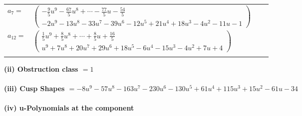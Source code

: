 \documentclass[1p]{elsarticle_modified}
\theoremstyle{definition}
\begin{document}
\begin{tabular}{m{7pt} m{180pt} m{7pt} m{180pt} }
\flushright $a_{7}=$&$\begin{pmatrix}-\frac{9}{5} u^9-\frac{67}{5} u^8+\cdots-\frac{77}{5} u-\frac{54}{5}\\-2 u^9-13 u^8-33 u^7-39 u^6-12 u^5+21 u^4+18 u^3-4 u^2-11 u-1\end{pmatrix}$ \\
\flushright $a_{12}=$&$\begin{pmatrix}\frac{1}{5} u^9+\frac{8}{5} u^8+\cdots+\frac{8}{5} u+\frac{16}{5}\\u^9+7 u^8+20 u^7+29 u^6+18 u^5-6 u^4-15 u^3-4 u^2+7 u+4\end{pmatrix}$\\&\end{tabular}
\flushleft \textbf{(ii) Obstruction class $= 1$}\\~\\
\flushleft \textbf{(iii) Cusp Shapes $= -8 u^9-57 u^8-163 u^7-230 u^6-130 u^5+61 u^4+115 u^3+15 u^2-61 u-34$}\\~\\
\newpage\renewcommand{\arraystretch}{1}
\flushleft \textbf{(iv) u-Polynomials at the component}\newline \\
\end{document}
